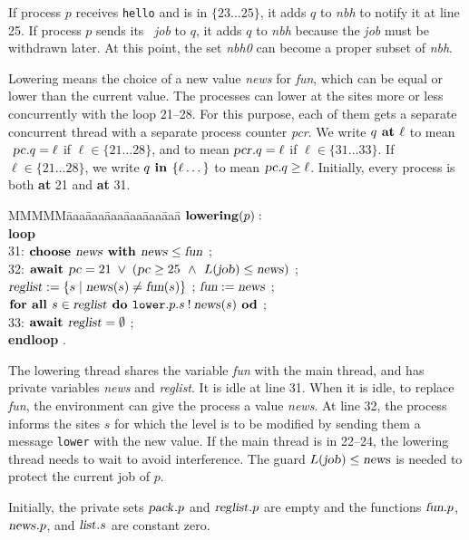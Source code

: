 \documentclass[10pt]{article} \usepackage[english]{babel}
\newenvironment{tab}{\begin{tabbing}
MMMMM\=aaa\=aaa\=aaa\=aaa\=aaa\=aaa\= \kill}{\end{tabbing}}
\def\S #1/{\mbox {\textsl{#1}}}
\def\B #1/{\mbox {\textbf{#1}}}
\def\T #1/{\mbox {\texttt{#1}}}
\def\Land   {\mbox{ $\;\land\;$ }}
\def\Lor    {\;\lor\;}
\begin{document}
If process $p$ receives \T hello/ and is in $\{23\dots 25\}$, it adds
$q$ to \S nbh/ to notify it at line 25.  If process $p$ sends its \S
job/ to $q$, it adds $q$ to \S nbh/ because the \S job/ must be
withdrawn later.  At this point, the set \S nbh0/ can become a proper
subset of \S nbh/.

Lowering means the choice of a new value \S news/ for \S fun/, which
can be equal or lower than the current value.  The processes can lower
at the sites more or less concurrently with the loop 21--28. For this
purpose, each of them gets a separate concurrent thread with a
separate process counter \S pcr/. We write $q\B\ at /\ell$ to mean $\S
pc/.q=\ell$ if $\ell\in\{21\dots 28\}$, and to mean $\S pcr/.q=\ell$
if $\ell\in\{31\dots 33\}$.  If $\ell\in\{21\dots 28\}$, we write
$q\B\ in /\{\ell\dots\}$ to mean $\S pc/.q\geq\ell$.  Initially, every
process is both \B at/ 21 and \B at/ 31.

\begin{tab}
  \>\+ $ \B lowering/(p): $\\
  \B loop/\\
  31: \>\> $ \B choose /\S news/\B\ with / \S news/\leq \S fun/ $ ;\\
  32: \>\> $ \B await / \S pc/ = 21\Lor
  (\S pc/ \geq 25\Land L(\S job/) \leq \S news/)$ ;\\
  \>\> $ \S reglist/ := \{s \mid \S news/(s) \ne \S fun/(s)\} $ ;
  $ \S fun/:= \S news/ $ ; \\
  \>\> $ \B for all /s \in\S reglist/\B\ do /
  \T lower/.p.s\:!\:\S news/(s) \B\ od/ $ ; \\
  33: \>\> $ \B await /\S reglist/ = \emptyset $ ;\\
  \B endloop/ .
\end{tab}

The lowering thread shares the variable \S fun/ with the main thread,
and has private variables \S news/ and \S reglist/.  It is idle at
line 31.  When it is idle, to replace \S fun/, the environment can
give the process a value \S news/.  At line 32, the process informs
the sites $s$ for which the level is to be modified by sending them a
message \T lower/ with the new value.  If the main thread is in
22--24, the lowering thread needs to wait to avoid interference.  The
guard $L(\S job/) \leq \S news/$ is needed to protect the current job
of $p$. 

Initially, the private sets $\S pack/.p$ and $\S reglist/.p$ are empty
and the functions $\S fun/.p$, $\S news/.p$, and $\S list/.s$ are
constant zero.
\end{document}
